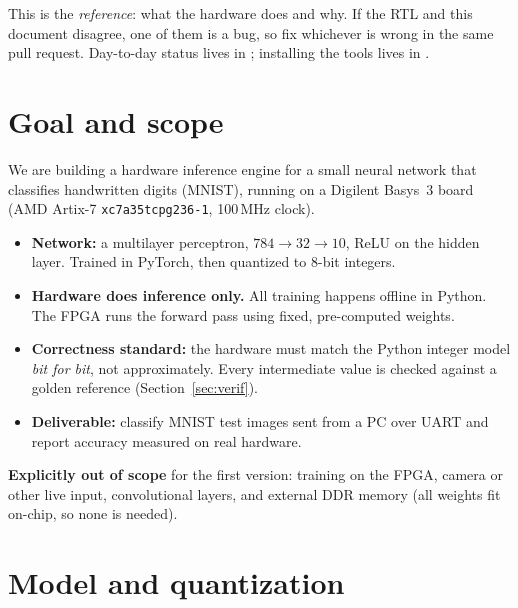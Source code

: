 \documentclass[11pt]{article}
\begin{document}

\begin{note}
This is the \emph{reference}: what the hardware does and why. If the RTL and this
document disagree, one of them is a bug, so fix whichever is wrong in the same
pull request. Day-to-day status lives in ; installing the
tools lives in .
\end{note}

\tableofcontents

\section{Goal and scope}

We are building a hardware inference engine for a small neural network that
classifies handwritten digits (MNIST), running on a Digilent Basys~3 board
(AMD Artix-7 \texttt{xc7a35tcpg236-1}, 100\,MHz clock).

\begin{itemize}
  \item \textbf{Network:} a multilayer perceptron, $784 \rightarrow 32 \rightarrow 10$,
        ReLU on the hidden layer. Trained in PyTorch, then quantized to 8-bit integers.
  \item \textbf{Hardware does inference only.} All training happens offline in Python.
        The FPGA runs the forward pass using fixed, pre-computed weights.
  \item \textbf{Correctness standard:} the hardware must match the Python integer
        model \emph{bit for bit}, not approximately. Every intermediate value is
        checked against a golden reference (Section~\ref{sec:verif}).
  \item \textbf{Deliverable:} classify MNIST test images sent from a PC over UART
        and report accuracy measured on real hardware.
\end{itemize}

\textbf{Explicitly out of scope} for the first version: training on the FPGA,
camera or other live input, convolutional layers, and external DDR memory (all
weights fit on-chip, so none is needed).

\section{Model and quantization}
\end{document}
